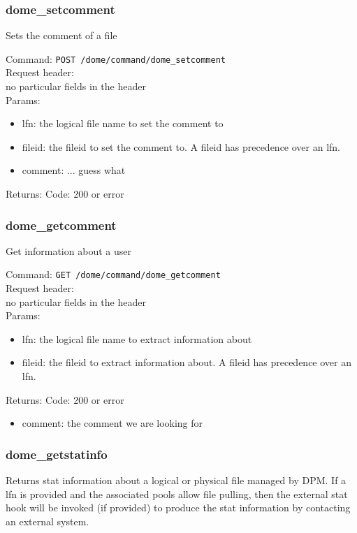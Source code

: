 \documentclass[a4paper,10pt]{scrreprt}
\begin{document}
\subsubsection{dome\_setcomment}

Sets the comment of a file

Command:
\lstinline"POST /dome/command/dome_setcomment"\\

Request header:\\
no particular fields in the header\\

Params:
\begin{itemize}
 \item lfn: the logical file name to set the comment to
 \item fileid: the fileid to set the comment to. A fileid has precedence over an lfn.
 \item comment: ... guess what
\end{itemize}

Returns:
Code: 200 or error


\subsubsection{dome\_getcomment}

Get information about a user

Command:
\lstinline"GET /dome/command/dome_getcomment"\\

Request header:\\
no particular fields in the header\\

Params:
\begin{itemize}
 \item lfn: the logical file name to extract information about
 \item fileid: the fileid to extract information about. A fileid has precedence over an lfn.
\end{itemize}

Returns:
Code: 200 or error
\begin{itemize}
 \item comment: the comment we are looking for
\end{itemize}


\subsubsection{dome\_getstatinfo}
Returns stat information about a logical or physical file managed by DPM.
If a lfn is provided and the associated pools allow file pulling, then the external stat hook will be invoked (if provided)
to produce the stat information by contacting an external system.
\end{document}
